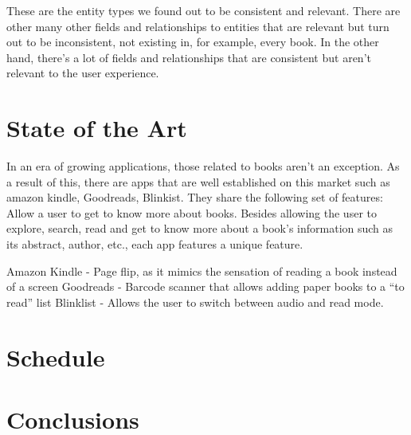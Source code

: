 \documentclass[twocolumn,twoside,11pt,a4paper]{article}
\begin{document}
These are the entity types we found out to be consistent and relevant. There are other many other fields and relationships to entities that are relevant but turn out to be inconsistent, not existing in, for example, every book. In the other hand, there's a lot of fields and relationships that are consistent but aren't relevant to the user experience.


\section{State of the Art}\label{sec:conclusions}

 In an era of growing applications, those related to books aren’t an exception. As a result of this, there are apps that are well established on this market such as amazon kindle, Goodreads, Blinkist. They share the following set of features: Allow a user to get to know more about books. Besides allowing the user to explore, search, read and get to know more about a book’s information such as its abstract, author, etc., each app features a unique feature.

Amazon Kindle - Page flip, as it mimics the sensation of reading a book instead of a screen
Goodreads - Barcode scanner that allows adding paper books to a “to read” list
Blinklist - Allows the user to switch between audio and read mode.


\section{Schedule}\label{sec:conclusions}


\section{Conclusions}\label{sec:conclusions}



\renewcommand{\bibname}{Referências}
%
%

%


\end{document}
